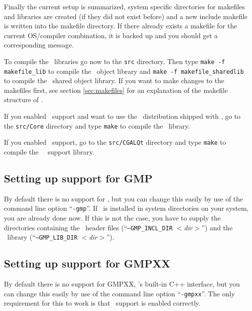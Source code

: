 Finally the current setup is summarized, system specific directories
for makefiles and libraries are created (if they did not exist before)
and a new include makefile is written into the makefile directory. If
there already exists a makefile for the current OS/compiler
combination, it is backed up and you should get a corresponding
message.

To compile the \cgal\ libraries go now to the \texttt{src} directory.
Then type \texttt{make -f makefile\_lib} to compile the \cgal\ object
library and \texttt{make -f makefile\_sharedlib} to compile the \cgal\ 
shared object library. If you want to make changes to the makefiles
first, see section \ref{sec:makefiles} for an explanation of the
makefile structure of \cgal.

If you enabled \core\ support and want to use the \core\ distribution
shipped with \cgal, go to the \texttt{src/Core} directory and type
\texttt{make} to compile the \core\ library.

If you enabled \qt\ support, go to the \texttt{src/CGALQt} directory
and type \texttt{make} to compile the \cgal\ \qt\ support library.


\subsection{Setting up support for GMP}\label{sec:gmp-setup}

By default there is no support for \gmp, but you can change this
easily by use of the command line option ``\texttt{-gmp}''. If \gmp\ is
installed in system directories on your system, you are already done
now. If this is not the case, you have to supply the directories
containing the \gmp\ header files (``\texttt{--GMP\_INCL\_DIR}
\textit{$<$dir$>$}'') and the \gmp\ library
(``\texttt{--GMP\_LIB\_DIR}
\textit{$<$dir$>$}'').

\subsection{Setting up support for GMPXX}\label{sec:gmpxx-setup}
\index{GMPXX@\texttt{GMPXX}!enable support}

By default there is no support for GMPXX, \gmp's built-in C++
interface, but you can change this easily by use of the command line
option ``\texttt{-gmpxx}''.  The only requirement for this to work is
that \gmp\ support is enabled correctly.

